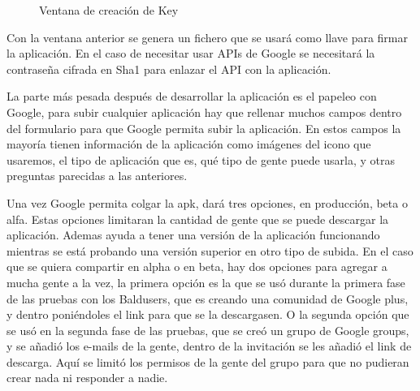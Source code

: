 \newpage
\begin{figure}[H] 
  \begin{center} 
    \caption{Ventana de creación de Key} 
    \label{fig:CreaciónKey} 
  \end{center} 
\end{figure}

Con la ventana anterior se genera un fichero que se usará como llave para firmar la aplicación. En el caso de necesitar usar APIs de Google se necesitará la contraseña cifrada en Sha1 para enlazar el API con la aplicación.


La parte más pesada después de desarrollar la aplicación es el papeleo con Google, para subir cualquier aplicación hay que rellenar muchos campos dentro del formulario para que Google permita subir la aplicación. En estos campos la mayoría tienen información de la aplicación como imágenes del icono que usaremos, el tipo de aplicación que es, qué tipo de gente puede usarla, y otras preguntas parecidas a las anteriores.

Una vez Google permita colgar la apk, dará tres opciones,  en producción, beta  o alfa. Estas opciones limitaran la cantidad de gente que se puede descargar la aplicación. Ademas ayuda a tener una versión de la aplicación funcionando mientras se está probando una versión superior en otro tipo de subida.
En el caso que se quiera compartir en alpha o en beta, hay dos opciones para agregar a mucha gente a la vez, la primera opción es la que se usó durante la primera fase de las pruebas con los Baldusers, que es creando una comunidad de Google plus, y dentro poniéndoles el link para que se la descargasen. O la segunda opción que se usó en la segunda fase de las pruebas, que se creó un grupo de Google groups, y se añadió los e-mails de la gente, dentro de la invitación se les añadió el link de descarga. Aquí se limitó los permisos de la gente del grupo para que no pudieran crear nada ni responder a nadie.


